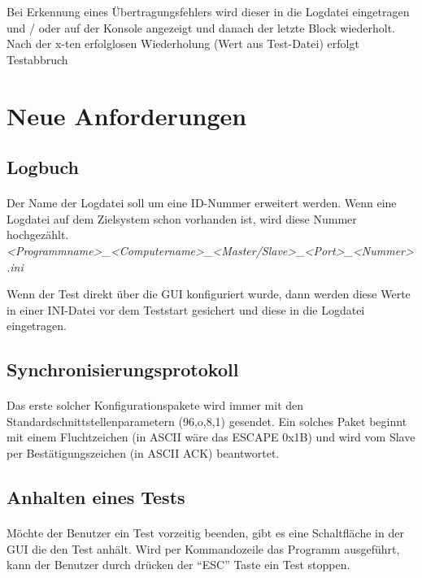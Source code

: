 Bei Erkennung eines Übertragungsfehlers wird dieser in die Logdatei eingetragen und / oder auf der Konsole angezeigt und danach der letzte Block wiederholt. Nach der x-ten erfolglosen Wiederholung (Wert aus Test-Datei) erfolgt Testabbruch

\newpage

\section{Neue Anforderungen}
\subsection{Logbuch}
\paragraph{}
Der Name der Logdatei soll um eine ID-Nummer erweitert werden. Wenn eine Logdatei auf dem Zielsystem schon vorhanden ist, wird diese Nummer hochgezählt.\\

\hspace*{10mm}\textit{<Programmname>\_<Computername>\_<Master/Slave>\_<Port>\_<Nummer>.ini}

Wenn der Test direkt über die GUI konfiguriert wurde, dann werden diese Werte in einer INI-Datei vor dem Teststart gesichert und diese in die Logdatei eingetragen.

\subsection{Synchronisierungsprotokoll}
\paragraph{}
Das erste solcher Konfigurationspakete wird immer mit den Standardschnittstellenparametern (96,o,8,1) gesendet. Ein solches Paket beginnt mit einem Fluchtzeichen (in ASCII wäre das ESCAPE 0x1B) und wird vom Slave per Bestätigungszeichen (in ASCII ACK) beantwortet.


\subsection{Anhalten eines Tests}
\paragraph{}
Möchte der Benutzer ein Test vorzeitig beenden, gibt es eine Schaltfläche in der GUI die den Test anhält. Wird per Kommandozeile das Programm ausgeführt, kann der Benutzer durch drücken der "`ESC"' Taste ein Test stoppen.
